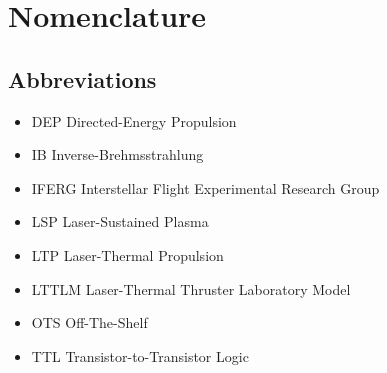 \chapter*{Nomenclature}
\setlength{\columnsep}{1cm}
\newenvironment{nomtable}
    {
        \centering
        \tabularx{\columnwidth}{r>{\raggedright\arraybackslash}X}
    }
    {
        \endtabularx
    }
\newenvironment{nomlist}
    {
        \begin{itemize}[leftmargin=1.5cm]
            \raggedright
            \setlength{\parsep}{0pt}
            \setlength{\itemsep}{-4pt}
    }
    {
        \end{itemize}
    }
\begin{multicols*}{2}
    \section*{Abbreviations}

    \begin{nomlist}
        \item[DEP]              Directed-Energy Propulsion
        \item[IB]               Inverse-Brehmsstrahlung 
        \item[IFERG]            Interstellar Flight Experimental Research Group
        \item[LSP]              Laser-Sustained Plasma
        \item[LTP]              Laser-Thermal Propulsion
        \item[LTTLM]            Laser-Thermal Thruster Laboratory Model
        \item[OTS]              Off-The-Shelf
        \item[TTL]              Transistor-to-Transistor Logic
    \end{nomlist}


\end{multicols*}
